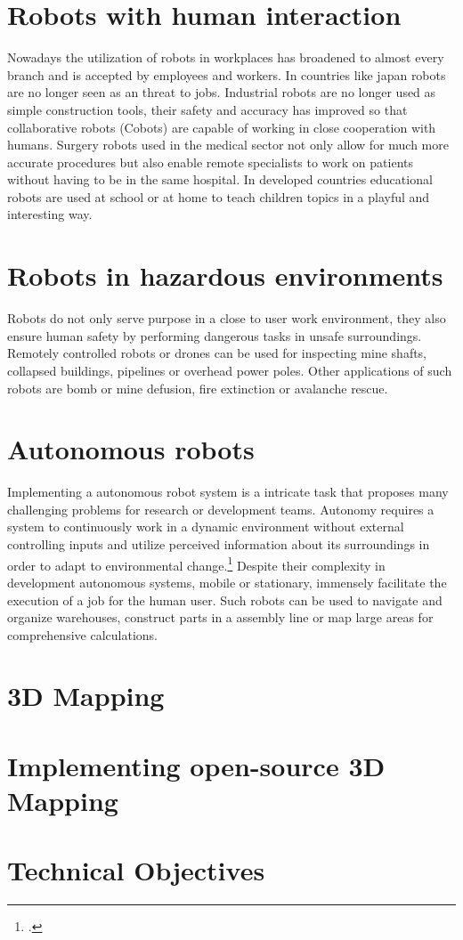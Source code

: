\section{Robots with human interaction}
Nowadays the utilization of robots in workplaces has broadened to almost every branch and is accepted by employees and workers. In countries like japan robots are no longer seen as an threat to jobs. 
Industrial robots are no longer used as simple construction tools, their safety and accuracy has improved so that collaborative robots (Cobots) are capable of working in close cooperation with humans. 
Surgery robots used in the medical sector not only allow for much more accurate procedures but also enable remote specialists to work on patients without having to be in the same hospital. 
In developed countries educational robots are used at school or at home to teach children topics in a playful and interesting way.

\section{Robots in hazardous environments}
Robots do not only serve purpose in a close to user work environment, they also ensure human safety by performing dangerous tasks in unsafe surroundings. 
Remotely controlled robots or drones can be used for inspecting mine shafts, collapsed buildings, pipelines or overhead power poles.
Other applications of such robots are bomb or mine defusion, fire extinction or avalanche rescue.

\section{Autonomous robots}
Implementing a autonomous robot system is a intricate task that proposes many challenging problems for research or development teams. Autonomy requires a system to continuously work in a dynamic environment without external controlling inputs and utilize perceived information about its surroundings in order to adapt to environmental change.\footcite{bekey2005autonomous}
Despite their complexity in development autonomous systems, mobile or stationary, immensely facilitate the execution of a job for the human user.
Such robots can be used to navigate and organize warehouses, construct parts in a assembly line or map large areas for comprehensive calculations.


\section{3D Mapping}

\section{Implementing open-source 3D Mapping}

\section{Technical Objectives}


\filbreak
